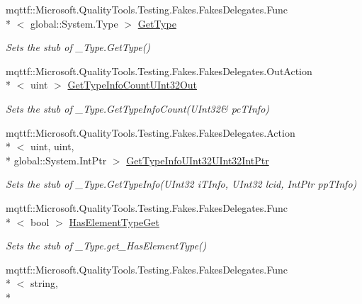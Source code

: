 \begin{DoxyCompactItemize}
mqttf\-::\-Microsoft.\-Quality\-Tools.\-Testing.\-Fakes.\-Fakes\-Delegates.\-Func\\*
$<$ global\-::\-System.\-Type $>$ \hyperlink{class_system_1_1_runtime_1_1_interop_services_1_1_fakes_1_1_stub___type_a295aff1bc1d4846c3880ac6d383ca389}{Get\-Type}
\begin{DoxyCompactList}\small\item\em Sets the stub of \-\_\-\-Type.\-Get\-Type()\end{DoxyCompactList}\item 
mqttf\-::\-Microsoft.\-Quality\-Tools.\-Testing.\-Fakes.\-Fakes\-Delegates.\-Out\-Action\\*
$<$ uint $>$ \hyperlink{class_system_1_1_runtime_1_1_interop_services_1_1_fakes_1_1_stub___type_abe4345db0f6e06e09ee3a45ef1ec9aa8}{Get\-Type\-Info\-Count\-U\-Int32\-Out}
\begin{DoxyCompactList}\small\item\em Sets the stub of \-\_\-\-Type.\-Get\-Type\-Info\-Count(U\-Int32\& pc\-T\-Info)\end{DoxyCompactList}\item 
mqttf\-::\-Microsoft.\-Quality\-Tools.\-Testing.\-Fakes.\-Fakes\-Delegates.\-Action\\*
$<$ uint, uint, \\*
global\-::\-System.\-Int\-Ptr $>$ \hyperlink{class_system_1_1_runtime_1_1_interop_services_1_1_fakes_1_1_stub___type_ada855fff82a35663d09410ac020b19ca}{Get\-Type\-Info\-U\-Int32\-U\-Int32\-Int\-Ptr}
\begin{DoxyCompactList}\small\item\em Sets the stub of \-\_\-\-Type.\-Get\-Type\-Info(\-U\-Int32 i\-T\-Info, U\-Int32 lcid, Int\-Ptr pp\-T\-Info)\end{DoxyCompactList}\item 
mqttf\-::\-Microsoft.\-Quality\-Tools.\-Testing.\-Fakes.\-Fakes\-Delegates.\-Func\\*
$<$ bool $>$ \hyperlink{class_system_1_1_runtime_1_1_interop_services_1_1_fakes_1_1_stub___type_a7a024441e631daeb78211cb935aa093d}{Has\-Element\-Type\-Get}
\begin{DoxyCompactList}\small\item\em Sets the stub of \-\_\-\-Type.\-get\-\_\-\-Has\-Element\-Type()\end{DoxyCompactList}\item 
mqttf\-::\-Microsoft.\-Quality\-Tools.\-Testing.\-Fakes.\-Fakes\-Delegates.\-Func\\*
$<$ string, \\*

\end{DoxyCompactItemize}
